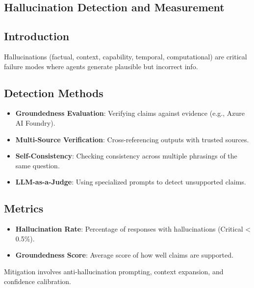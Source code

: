 \begin{TNtwocol}
\section{Hallucination Detection and Measurement}
\subsection{Introduction}
Hallucinations (factual, context, capability, temporal, computational) are critical failure modes where agents generate plausible but incorrect info.

\subsection{Detection Methods}
\begin{itemize}
    \item \textbf{Groundedness Evaluation}: Verifying claims against evidence (e.g., Azure AI Foundry).
    \item \textbf{Multi-Source Verification}: Cross-referencing outputs with trusted sources.
    \item \textbf{Self-Consistency}: Checking consistency across multiple phrasings of the same question.
    \item \textbf{LLM-as-a-Judge}: Using specialized prompts to detect unsupported claims.
\end{itemize}

\subsection{Metrics}
\begin{itemize}
    \item \textbf{Hallucination Rate}: Percentage of responses with hallucinations (Critical < 0.5\%).
    \item \textbf{Groundedness Score}: Average score of how well claims are supported.
\end{itemize}
Mitigation involves anti-hallucination prompting, context expansion, and confidence calibration.
\end{TNtwocol}

